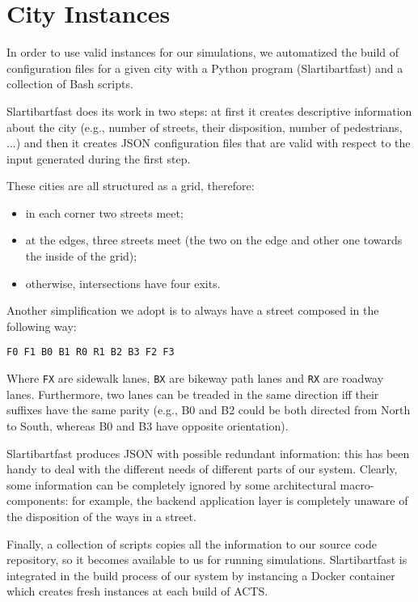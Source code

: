 \section{City Instances}

In order to use valid instances for our simulations, we automatized the build
of configuration files for a given city with a Python program (Slartibartfast)
and a collection of Bash scripts.

Slartibartfast does its work in two steps: at first it creates
descriptive information about the city (e.g., number of streets, their
disposition, number of pedestrians, ...) and then it creates JSON configuration
files that are valid with respect to the input generated during the first step.

These cities are all structured as a grid, therefore:

\begin{itemize}
    \item in each corner two streets meet;
    \item at the edges, three streets meet (the two on the edge and other one
        towards the inside of the grid);
    \item otherwise, intersections have four exits.
\end{itemize}

Another simplification we adopt is to always have a street composed in the
following way:

\begin{verbatim}
F0 F1 B0 B1 R0 R1 B2 B3 F2 F3
\end{verbatim}

Where \texttt{FX} are sidewalk lanes, \texttt{BX} are bikeway path lanes and
\texttt{RX} are roadway lanes. Furthermore, two lanes can be treaded in the
same direction iff their suffixes have the same parity (e.g., B0 and B2
could be both directed from North to South, whereas B0 and B3 have opposite
orientation).

Slartibartfast produces JSON with possible redundant information: this has
been handy to deal with the different needs of different parts of our system.
Clearly, some information can be completely ignored by some architectural
macro-components: for example, the backend application layer is completely
unaware of the disposition of the ways in a street.

Finally, a collection of scripts copies all the information to our source code
repository, so it becomes available to us for running simulations.
Slartibartfast is integrated in the build process of our system by instancing
a Docker container which creates fresh instances at each build of ACTS.
